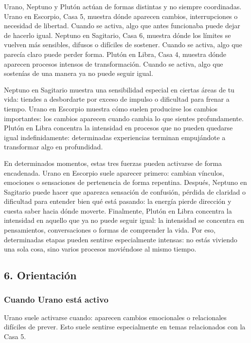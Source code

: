 \documentclass[11pt,a4paper]{article}
\begin{document}
Urano, Neptuno y Plutón actúan de formas distintas y no siempre coordinadas. Urano en Escorpio, Casa 5, muestra dónde aparecen cambios, interrupciones o necesidad de libertad. Cuando se activa, algo que antes funcionaba puede dejar de hacerlo igual. Neptuno en Sagitario, Casa 6, muestra dónde los límites se vuelven más sensibles, difusos o difíciles de sostener. Cuando se activa, algo que parecía claro puede perder forma. Plutón en Libra, Casa 4, muestra dónde aparecen procesos intensos de transformación. Cuando se activa, algo que sostenías de una manera ya no puede seguir igual.

Neptuno en Sagitario muestra una sensibilidad especial en ciertas áreas de tu vida: tiendes a desbordarte por exceso de impulso o dificultad para frenar a tiempo. Urano en Escorpio muestra cómo suelen producirse los cambios importantes: los cambios aparecen cuando cambia lo que sientes profundamente. Plutón en Libra concentra la intensidad en procesos que no pueden quedarse igual indefinidamente: determinadas experiencias terminan empujándote a transformar algo en profundidad.

En determinados momentos, estas tres fuerzas pueden activarse de forma encadenada. Urano en Escorpio suele aparecer primero: cambian vínculos, emociones o sensaciones de pertenencia de forma repentina. Después, Neptuno en Sagitario puede hacer que aparezca sensación de confusión, pérdida de claridad o dificultad para entender bien qué está pasando: la energía pierde dirección y cuesta saber hacia dónde moverte. Finalmente, Plutón en Libra concentra la intensidad en aquello que ya no puede seguir igual: la intensidad se concentra en pensamientos, conversaciones o formas de comprender la vida. Por eso, determinadas etapas pueden sentirse especialmente intensas: no estás viviendo una sola cosa, sino varios procesos moviéndose al mismo tiempo.

\vspace{0.8cm}

\subsection{6. Orientación}

\subsubsection*{Cuando Urano está activo}
Urano suele activarse cuando: aparecen cambios emocionales o relacionales difíciles de prever. Esto suele sentirse especialmente en temas relacionados con la Casa 5.
\end{document}
